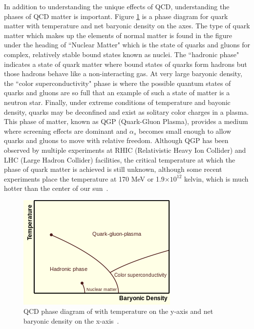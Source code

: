 In addition to understanding the unique effects of QCD, understanding the phases of QCD matter is important. Figure \ref{fig:qcd_phase} is a phase diagram for quark matter with temperature  and net baryonic density on the axes. The type of quark matter which makes up the elements of normal matter is found in the figure under the heading of ``Nuclear Matter" which is the state of quarks and gluons for complex, relatively stable bound states known as nuclei. The ``hadronic phase" indicates a state of quark matter where bound states of quarks form hadrons but those hadrons behave like a non-interacting gas. At very large baryonic density, the ``color superconductivity" phase is where the possible quantum states of quarks and gluons are so full that an example of such a state of matter is a neutron star. Finally, under extreme conditions of temperature and bayonic density, quarks may be deconfined and exist as solitary color charges in a plasma. This phase of matter, known as QGP (Quark-Gluon Plasma), provides a medium where screening effects are dominant and $\alpha_s$ becomes small enough to allow quarks and gluons to move with relative freedom. Although QGP has been observed by multiple experiments at RHIC (Relativistic Heavy Ion Collider) and LHC (Large Hadron Collider) facilities, the critical temperature at which the phase of quark matter is achieved is still unknown, although some recent experiments place the temperature at 170 MeV or 1.9$\times10^{12}$ kelvin, which is much hotter than the center of our sun~\cite{doi:10.1142/9789814689304_0031}.

\begin{figure}[!ht]
\begin{center}
\includegraphics[width=0.55\linewidth]{figs/qcd_phase_diagram.png}
\caption{QCD phase diagram of with temperature on the y-axis and net baryonic density on the x-axis~\cite{Bhalerao:2014owa}.}
\end{center}
\label{fig:qcd_phase}
\end{figure}

